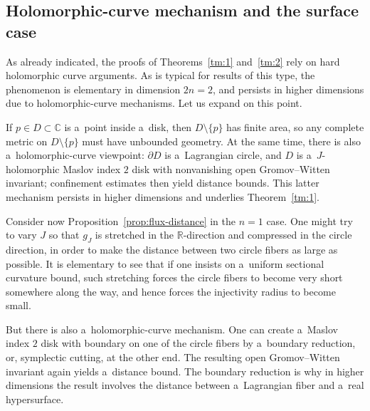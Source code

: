 \documentclass[pdftex]{sigma}
\numberwithin{equation}{section}
\newcommand{\bC}{{\mathbb C}}
\newcommand{\bR}{{\mathbb R}}
\theoremstyle{definition}
\begin{document}
\subsection{Holomorphic-curve mechanism and the surface case}

As already indicated, the proofs of Theorems~\ref{tm:1} and~\ref{tm:2} rely on hard holomorphic curve arguments. As is typical for results of this type, the phenomenon is elementary in dimension $2n=2$, and persists in higher dimensions due to holomorphic-curve mechanisms.
Let us expand on this point.

If $p\in D\subset\bC$ is a~point inside a~disk, then $D\setminus\{p\}$ has finite area, so any complete metric on $D\setminus\{p\}$ must have unbounded geometry.
At the same time, there is also a~holomorphic-curve viewpoint: $\partial D$ is a~Lagrangian circle, and $D$ is a~$J$-holomorphic Maslov index $2$ disk with nonvanishing open Gromov--Witten invariant; confinement estimates then yield distance bounds.
This latter mechanism persists in higher dimensions and underlies Theorem~\ref{tm:1}.

Consider now Proposition~\ref{prop:flux-distance} in the $n=1$ case. One might try to vary $J$ so that $g_J$ is stretched in the $\bR$-direction and compressed in the circle direction, in order to make the distance between two circle fibers as large as possible. It is elementary to see that if one insists on a~uniform sectional curvature bound, such stretching forces the circle fibers to become very short somewhere along the way, and hence forces the injectivity radius to become small.


But there is also a~holomorphic-curve mechanism. One can create a~Maslov index $2$ disk with boundary on one of the circle fibers by a~boundary reduction, or, symplectic cutting, at the other end. The resulting open Gromov--Witten invariant again yields a~distance bound. The boundary reduction is why in higher dimensions the result involves the distance between a~Lagrangian fiber and a~real hypersurface.
\end{document}
